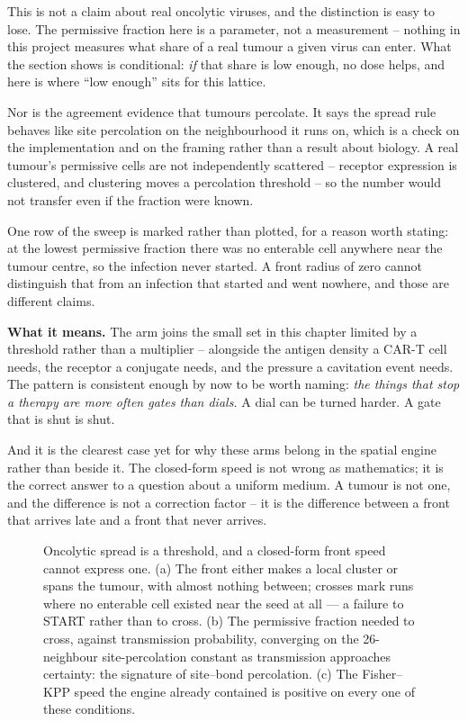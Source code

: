 \documentclass[11pt,twoside,openright]{report}
\begin{document}
\begin{refusal}
This is not a claim about real oncolytic viruses, and the distinction is easy to lose. The permissive fraction here is a parameter, not a measurement -- nothing in this project measures what share of a real tumour a given virus can enter. What the section shows is conditional: \textit{if} that share is low enough, no dose helps, and here is where ``low enough'' sits for this lattice.

Nor is the agreement evidence that tumours percolate. It says the spread rule behaves like site percolation on the neighbourhood it runs on, which is a check on the implementation and on the framing rather than a result about biology. A real tumour's permissive cells are not independently scattered -- receptor expression is clustered, and clustering moves a percolation threshold -- so the number would not transfer even if the fraction were known.

One row of the sweep is marked rather than plotted, for a reason worth stating: at the lowest permissive fraction there was no enterable cell anywhere near the tumour centre, so the infection never started. A front radius of zero cannot distinguish that from an infection that started and went nowhere, and those are different claims.
\end{refusal}

\textbf{What it means.} The arm joins the small set in this chapter limited by a threshold rather than a multiplier -- alongside the antigen density a CAR-T cell needs, the receptor a conjugate needs, and the pressure a cavitation event needs. The pattern is consistent enough by now to be worth naming: \textit{the things that stop a therapy are more often gates than dials.} A dial can be turned harder. A gate that is shut is shut.

And it is the clearest case yet for why these arms belong in the spatial engine rather than beside it. The closed-form speed is not wrong as mathematics; it is the correct answer to a question about a uniform medium. A tumour is not one, and the difference is not a correction factor -- it is the difference between a front that arrives late and a front that never arrives.

\begin{figure}[tbp]
\setcounter{figure}{41}
\caption{Oncolytic spread is a threshold, and a closed-form front speed cannot express one. (a) The front either makes a local cluster or spans the tumour, with almost nothing between; crosses mark runs where no enterable cell existed near the seed at all --- a failure to START rather than to cross. (b) The permissive fraction needed to cross, against transmission probability, converging on the 26-neighbour site-percolation constant as transmission approaches certainty: the signature of site--bond percolation. (c) The Fisher--KPP speed the engine already contained is positive on every one of these conditions.}
\label{fig:fig46_oncolytic_percolation}
\end{figure}
\end{document}
